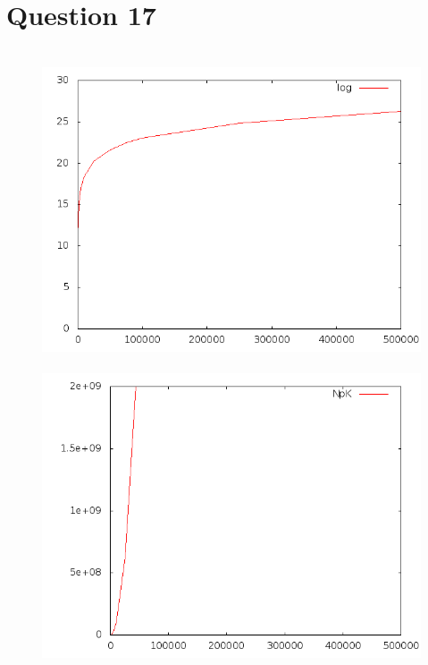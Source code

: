 \documentclass[a4paper,12pt]{report}
\begin{document}
\newpage

\section*{Question 17}
\begin{figure}[!ht]
	\hbox{ 
     	\hspace*{1cm}
		\includegraphics[scale=0.3]{q161.png}
     	\hspace*{1cm}
		\includegraphics[scale=0.3]{q162.png}
	}
	\hbox{ 
     	\hspace*{1cm}
}
\end{figure}
\end{document}
